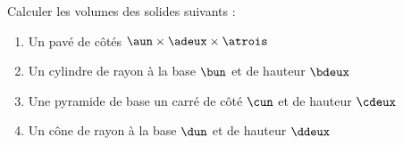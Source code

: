 \documentclass{/home/nyaucki/Documents/Prof/CoursMaths/mycls/DevoirMaison}
\begin{document}
\renewcommand{\nom}{} 

\renewcommand{\prenom}{}



Calculer les volumes des solides suivants :

\begin{multicols}{4}
	\begin{enumerate}[label=\alph*.]
		\item Un pavé de côtés $\aun \times \adeux \times \atrois$  \vspace*{13em}
		\item Un cylindre de rayon à la base $\bun$ et de hauteur $\bdeux$ \vspace*{12em}
		\item Une pyramide de base un carré de côté $\cun$ et de hauteur $\cdeux$ \vspace*{11em}
		\item Un cône de rayon à la base $\dun$ et de hauteur $\ddeux$ \vspace*{12em}
	\end{enumerate}
\end{multicols}
\end{document}
